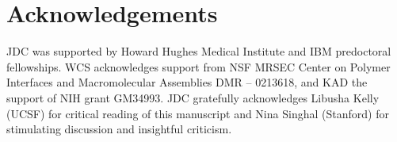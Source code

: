 \section{Acknowledgements}

JDC was supported by Howard Hughes Medical Institute and IBM predoctoral fellowships.
WCS acknowledges support from NSF MRSEC Center on Polymer Interfaces and Macromolecular Assemblies DMR -- 0213618, and KAD the support of NIH grant GM34993.
JDC gratefully acknowledges Libusha Kelly (UCSF) for critical reading of this manuscript and Nina Singhal (Stanford) for stimulating discussion and insightful criticism.

%

%

